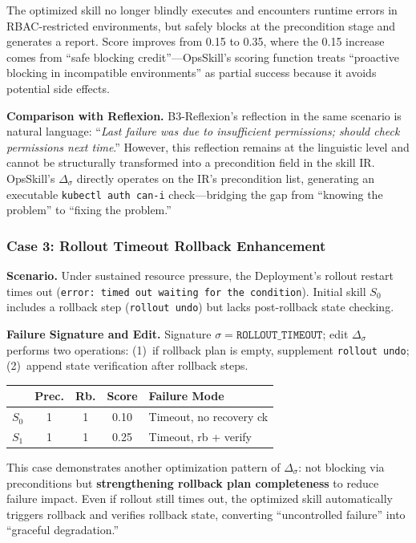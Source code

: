 \documentclass[conference,10pt]{IEEEtran}
\begin{document}
\noindent The optimized skill no longer blindly executes and encounters runtime errors in RBAC-restricted environments, but safely blocks at the precondition stage and generates a report.
Score improves from 0.15 to 0.35, where the 0.15 increase comes from ``safe blocking credit''---OpsSkill's scoring function treats ``proactive blocking in incompatible environments'' as partial success because it avoids potential side effects.

\textbf{Comparison with Reflexion.}
B3-Reflexion's reflection in the same scenario is natural language: ``\emph{Last failure was due to insufficient permissions; should check permissions next time}.''
However, this reflection remains at the linguistic level and cannot be structurally transformed into a precondition field in the skill IR.
OpsSkill's $\Delta_\sigma$ directly operates on the IR's precondition list, generating an executable \texttt{kubectl auth can-i} check---bridging the gap from ``knowing the problem'' to ``fixing the problem.''

\subsubsection{Case 3: Rollout Timeout Rollback Enhancement}

\textbf{Scenario.}
Under sustained resource pressure, the Deployment's rollout restart times out (\texttt{error: timed out waiting for the condition}).
Initial skill $S_0$ includes a rollback step (\texttt{rollout undo}) but lacks post-rollback state checking.

\textbf{Failure Signature and Edit.}
Signature $\sigma = \texttt{ROLLOUT\_TIMEOUT}$; edit $\Delta_\sigma$ performs two operations: (1)~if rollback plan is empty, supplement \texttt{rollout undo}; (2)~append state verification after rollback steps.

{\footnotesize
\begin{center}
\begin{tabular}{lcccp{2.5cm}}
\toprule
& \textbf{Prec.} & \textbf{Rb.} & \textbf{Score} & \textbf{Failure Mode} \\
\midrule
$S_0$ & 1 & 1 & 0.10 & Timeout, no recovery ck \\
$S_1$ & 1 & 1 & 0.25 & Timeout, rb + verify \\
\bottomrule
\end{tabular}
\end{center}
}

\noindent This case demonstrates another optimization pattern of $\Delta_\sigma$: not blocking via preconditions but \textbf{strengthening rollback plan completeness} to reduce failure impact.
Even if rollout still times out, the optimized skill automatically triggers rollback and verifies rollback state, converting ``uncontrolled failure'' into ``graceful degradation.''
\end{document}
